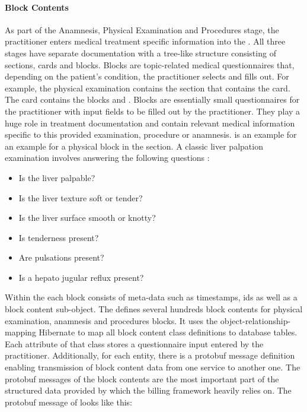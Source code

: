 \paragraph{Block Contents}
As part of the Anamnesis, Physical Examination and Procedures stage,
the practitioner enters medical treatment specific information into the \AVS.
All three stages have separate documentation with a tree-like structure consisting of sections, cards and blocks.
Blocks are topic-related medical questionnaires that, depending on the patient's condition, the practitioner selects and fills out.
For example, the physical examination contains the section  that contains the  card.
The  card contains the blocks  and .
Blocks are essentially small questionnaires for the practitioner with input fields to be filled out by the practitioner.
They play a huge role in treatment documentation and contain relevant medical information specific to this provided examination, procedure or anamnesis.
 is an example for an example for a physical block in the  section.
A classic liver palpation examination involves answering the following questions \cite{wolf1990evaluation}:
\begin{itemize}
    \item Is the liver palpable?
    \item Is the liver texture soft or tender?
    \item Is the liver surface smooth or knotty?
    \item Is tenderness present?
    \item Are pulsations present?
    \item Is a hepato jugular reflux present?
\end{itemize}
Within the \AVS each block consists of meta-data such as timestamps, ids as well as a block content sub-object.
The \AVS defines several hundreds block contents for physical examination, anamnesis and procedures blocks.
It uses the object-relationship-mapping Hibernate to map all block content class definitions to database tables.
Each attribute of that class stores a questionnaire input entered by the practitioner.
Additionally, for each entity, there is a protobuf message definition enabling transmission of block content data from one service
to another one.
The protobuf messages of the block contents are the most important part of the structured data provided by \AV which the billing framework heavily relies on.
The protobuf message of  looks like this:



